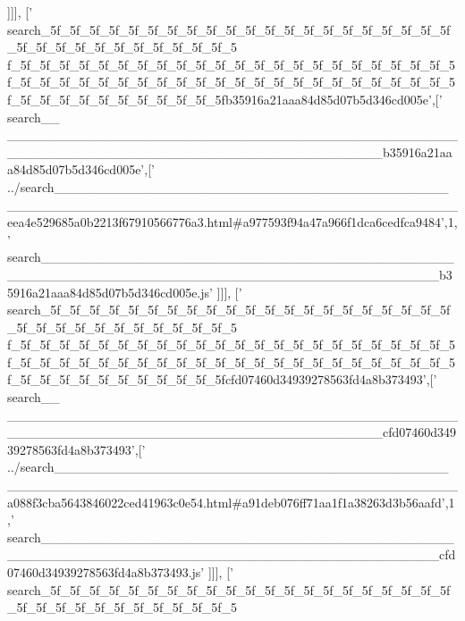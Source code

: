 \begin{DoxyCode}
      ]]],
  [\textcolor{stringliteral}{'
      search\_5f\_5f\_5f\_5f\_5f\_5f\_5f\_5f\_5f\_5f\_5f\_5f\_5f\_5f\_5f\_5f\_5f\_5f\_5f\_5f\_5f\_5f\_5f\_5f\_5f\_5f\_5f\_5f\_5f\_5f\_5f\_5f\_5
      f\_5f\_5f\_5f\_5f\_5f\_5f\_5f\_5f\_5f\_5f\_5f\_5f\_5f\_5f\_5f\_5f\_5f\_5f\_5f\_5f\_5f\_5f\_5f\_5f\_5f\_5f\_5f\_5f\_5f\_5f\_5f\_5f\_5f\_5f\_5f\_5f\_5f\_5f\_5f\_5f\_5f\_5f\_5f\_5f\_5f\_5f\_5f\_5f\_5f\_5f\_5f\_5f\_5f\_5f\_5f\_5f\_5fb35916a21aaa84d85d07b5d346cd005e'},[\textcolor{stringliteral}{'
      search\_\_
      \_\_\_\_\_\_\_\_\_\_\_\_\_\_\_\_\_\_\_\_\_\_\_\_\_\_\_\_\_\_\_\_\_\_\_\_\_\_\_\_\_\_\_\_\_\_\_\_\_\_\_\_\_\_\_\_\_\_\_\_\_\_\_\_\_\_\_\_\_\_\_\_\_\_\_\_\_\_\_\_\_\_\_\_\_\_\_\_b35916a21aaa84d85d07b5d346cd005e'},[\textcolor{stringliteral}{'
      ../search\_\_\_\_\_\_\_\_\_\_\_\_\_\_\_\_\_\_\_\_\_\_\_\_\_\_\_\_\_\_\_\_\_\_\_\_\_\_\_\_\_\_\_\_\_\_\_\_\_\_\_\_\_\_\_\_\_\_\_\_\_\_\_\_\_\_\_\_\_\_\_\_\_\_\_\_\_\_\_\_\_\_\_\_\_\_\_\_\_\_eea4e529685a0b2213f67910566776a3.html#a977593f94a47a966f1dca6cedfca9484'},1,\textcolor{stringliteral}{'
      search\_\_\_\_\_\_\_\_\_\_\_\_\_\_\_\_\_\_\_\_\_\_\_\_\_\_\_\_\_\_\_\_\_\_\_\_\_\_\_\_\_\_\_\_\_\_\_\_\_\_\_\_\_\_\_\_\_\_\_\_\_\_\_\_\_\_\_\_\_\_\_\_\_\_\_\_\_\_\_\_\_\_\_\_\_\_\_\_\_\_b35916a21aaa84d85d07b5d346cd005e.js'}
      ]]],
  [\textcolor{stringliteral}{'
      search\_5f\_5f\_5f\_5f\_5f\_5f\_5f\_5f\_5f\_5f\_5f\_5f\_5f\_5f\_5f\_5f\_5f\_5f\_5f\_5f\_5f\_5f\_5f\_5f\_5f\_5f\_5f\_5f\_5f\_5f\_5f\_5f\_5
      f\_5f\_5f\_5f\_5f\_5f\_5f\_5f\_5f\_5f\_5f\_5f\_5f\_5f\_5f\_5f\_5f\_5f\_5f\_5f\_5f\_5f\_5f\_5f\_5f\_5f\_5f\_5f\_5f\_5f\_5f\_5f\_5f\_5f\_5f\_5f\_5f\_5f\_5f\_5f\_5f\_5f\_5f\_5f\_5f\_5f\_5f\_5f\_5f\_5f\_5f\_5f\_5f\_5f\_5f\_5f\_5f\_5fcfd07460d34939278563fd4a8b373493'},[\textcolor{stringliteral}{'
      search\_\_
      \_\_\_\_\_\_\_\_\_\_\_\_\_\_\_\_\_\_\_\_\_\_\_\_\_\_\_\_\_\_\_\_\_\_\_\_\_\_\_\_\_\_\_\_\_\_\_\_\_\_\_\_\_\_\_\_\_\_\_\_\_\_\_\_\_\_\_\_\_\_\_\_\_\_\_\_\_\_\_\_\_\_\_\_\_\_\_\_cfd07460d34939278563fd4a8b373493'},[\textcolor{stringliteral}{'
      ../search\_\_\_\_\_\_\_\_\_\_\_\_\_\_\_\_\_\_\_\_\_\_\_\_\_\_\_\_\_\_\_\_\_\_\_\_\_\_\_\_\_\_\_\_\_\_\_\_\_\_\_\_\_\_\_\_\_\_\_\_\_\_\_\_\_\_\_\_\_\_\_\_\_\_\_\_\_\_\_\_\_\_\_\_\_\_\_\_\_\_a088f3cba5643846022ced41963c0e54.html#a91deb076ff71aa1f1a38263d3b56aafd'},1,\textcolor{stringliteral}{'
      search\_\_\_\_\_\_\_\_\_\_\_\_\_\_\_\_\_\_\_\_\_\_\_\_\_\_\_\_\_\_\_\_\_\_\_\_\_\_\_\_\_\_\_\_\_\_\_\_\_\_\_\_\_\_\_\_\_\_\_\_\_\_\_\_\_\_\_\_\_\_\_\_\_\_\_\_\_\_\_\_\_\_\_\_\_\_\_\_\_\_cfd07460d34939278563fd4a8b373493.js'}
      ]]],
  [\textcolor{stringliteral}{'
      search\_5f\_5f\_5f\_5f\_5f\_5f\_5f\_5f\_5f\_5f\_5f\_5f\_5f\_5f\_5f\_5f\_5f\_5f\_5f\_5f\_5f\_5f\_5f\_5f\_5f\_5f\_5f\_5f\_5f\_5f\_5f\_5f\_5
}
\end{DoxyCode}
